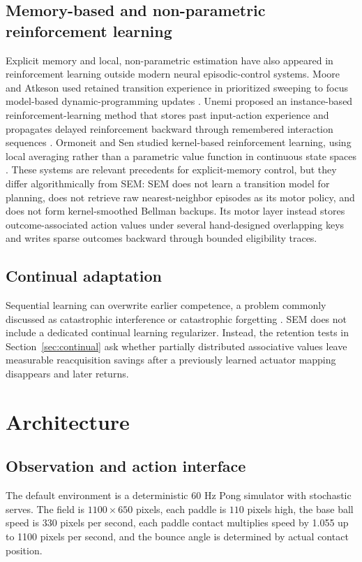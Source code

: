 \documentclass[10pt,twocolumn]{article}
\begin{document}
\subsection{Memory-based and non-parametric reinforcement learning}
Explicit memory and local, non-parametric estimation have also appeared in reinforcement learning outside modern neural episodic-control systems. Moore and Atkeson used retained transition experience in prioritized sweeping to focus model-based dynamic-programming updates \citep{moore1992memory,moore1993prioritized}. Unemi proposed an instance-based reinforcement-learning method that stores past input-action experience and propagates delayed reinforcement backward through remembered interaction sequences \citep{unemi1992instance}. Ormoneit and Sen studied kernel-based reinforcement learning, using local averaging rather than a parametric value function in continuous state spaces \citep{ormoneit2002kernel}. These systems are relevant precedents for explicit-memory control, but they differ algorithmically from SEM: SEM does not learn a transition model for planning, does not retrieve raw nearest-neighbor episodes as its motor policy, and does not form kernel-smoothed Bellman backups. Its motor layer instead stores outcome-associated action values under several hand-designed overlapping keys and writes sparse outcomes backward through bounded eligibility traces.

\subsection{Continual adaptation}
Sequential learning can overwrite earlier competence, a problem commonly discussed as catastrophic interference or catastrophic forgetting \citep{mccloskey1989catastrophic,kirkpatrick2017ewc}. SEM does not include a dedicated continual learning regularizer. Instead, the retention tests in Section~\ref{sec:continual} ask whether partially distributed associative values leave measurable reacquisition savings after a previously learned actuator mapping disappears and later returns.

\section{Architecture}
\subsection{Observation and action interface}
The default environment is a deterministic 60 Hz Pong simulator with stochastic serves. The field is $1100\times650$ pixels, each paddle is $110$ pixels high, the base ball speed is 330 pixels per second, each paddle contact multiplies speed by 1.055 up to 1100 pixels per second, and the bounce angle is determined by actual contact position.
\end{document}
